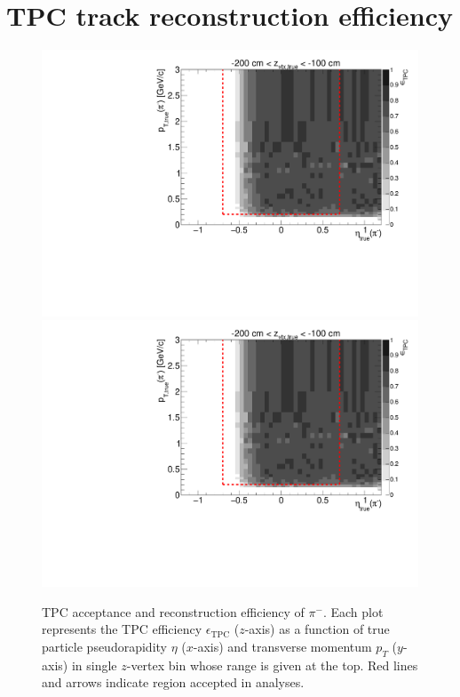
\chapter{TPC track reconstruction efficiency}\label{appendix:tpcEff}


\begin{figure}[hb]
\caption[TPC acceptance and reconstruction efficiency of $\pi^{-}$.]{TPC acceptance and reconstruction efficiency of $\pi^{-}$. Each plot represents the TPC efficiency $\epsilon_{\text{TPC}}$ ($z$-axis) as a function of true particle pseudorapidity $\eta$ ($x$-axis) and transverse momentum $p_{T}$ ($y$-axis) in single $z$-vertex bin whose range is given at the top. Red lines and arrows indicate region accepted in analyses.}\label{fig:tpcEff_pion_minus}
\centering
\parbox{0.495\textwidth}{
  \centering
  \includegraphics[width=\linewidth,page=3]{graphics/eff/Eff2D_TPC_pion_Minus.pdf}\\
  \includegraphics[width=\linewidth,page=5]{graphics/eff/Eff2D_TPC_pion_Minus.pdf}\\
}
\end{figure}
